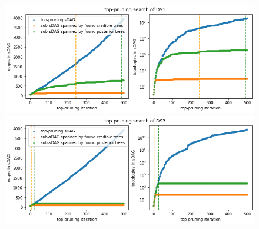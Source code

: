 \documentclass{article}
\begin{document}
\begin{figure}[!b]\centering
\includegraphics[scale=0.4]{figures/tp_ds1_counts.png}
\includegraphics[scale=0.4]{figures/tp_ds3_counts.png}
\end{figure}
\end{document}
